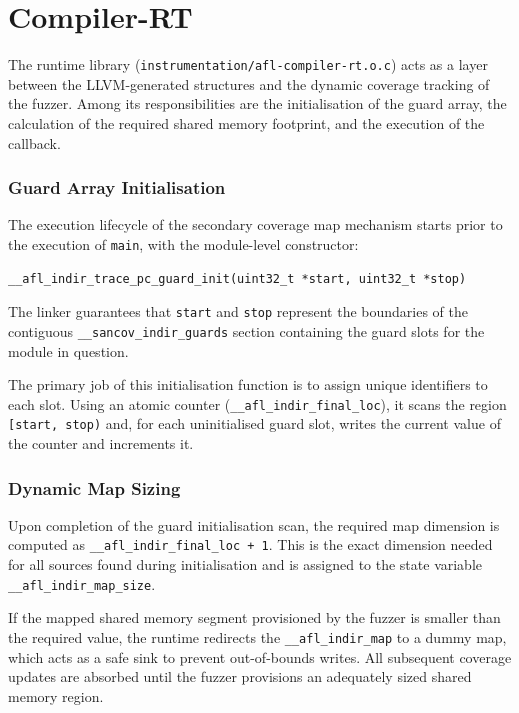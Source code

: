 \section{Compiler-RT}

The runtime library (\texttt{instrumentation/afl-compiler-rt.o.c}) acts as a layer between the LLVM-generated structures and the dynamic coverage tracking of the fuzzer. Among its responsibilities are the initialisation of the guard array, the calculation of the required shared memory footprint, and the execution of the callback.

\subsubsection{Guard Array Initialisation}

The execution lifecycle of the secondary coverage map mechanism starts prior to the execution of \texttt{main}, with the module-level constructor:
\begin{verbatim}
__afl_indir_trace_pc_guard_init(uint32_t *start, uint32_t *stop)
\end{verbatim}

The linker guarantees that \texttt{start} and \texttt{stop} represent the boundaries of the contiguous \texttt{\_\_sancov\_indir\_guards} section containing the guard slots for the module in question.

The primary job of this initialisation function is to assign unique identifiers to each slot. Using an atomic counter (\texttt{\_\_afl\_indir\_final\_loc}), it scans the region \texttt{[start, stop)} and, for each uninitialised guard slot, writes the current value of the counter and increments it.

\subsubsection{Dynamic Map Sizing}

Upon completion of the guard initialisation scan, the required map dimension is computed as \texttt{\_\_afl\_indir\_final\_loc + 1}. This is the exact dimension needed for all sources found during initialisation and is assigned to the state variable \texttt{\_\_afl\_indir\_map\_size}. 

If the mapped shared memory segment provisioned by the fuzzer is smaller than the required value, the runtime redirects the \texttt{\_\_afl\_indir\_map} to a dummy map, which acts as a safe sink to prevent out-of-bounds writes. All subsequent coverage updates are absorbed until the fuzzer provisions an adequately sized shared memory region.

